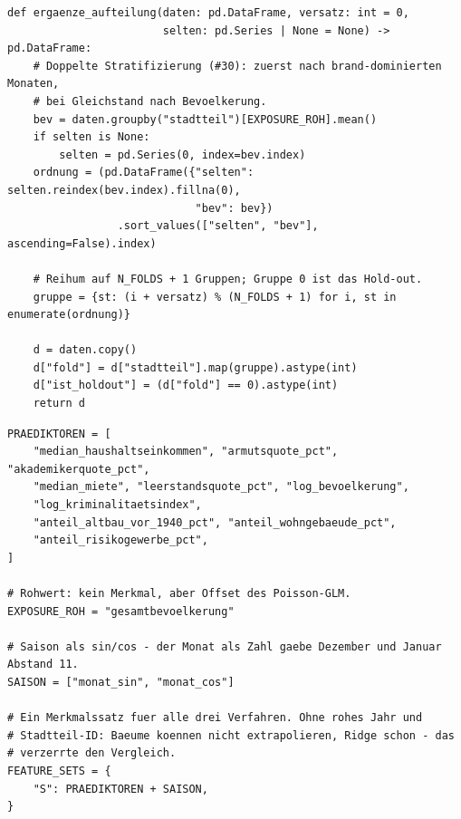 
\begin{lstlisting}[style=pythonstil,
  label={lst:folds},
  caption={Fold-Zuteilung mit doppelter Stratifizierung
           (\texttt{prep/s2\_datensaetze.py}, Z.~61--93, gekürzt)}]
def ergaenze_aufteilung(daten: pd.DataFrame, versatz: int = 0,
                        selten: pd.Series | None = None) -> pd.DataFrame:
    # Doppelte Stratifizierung (#30): zuerst nach brand-dominierten Monaten,
    # bei Gleichstand nach Bevoelkerung.
    bev = daten.groupby("stadtteil")[EXPOSURE_ROH].mean()
    if selten is None:
        selten = pd.Series(0, index=bev.index)
    ordnung = (pd.DataFrame({"selten": selten.reindex(bev.index).fillna(0),
                             "bev": bev})
                 .sort_values(["selten", "bev"], ascending=False).index)

    # Reihum auf N_FOLDS + 1 Gruppen; Gruppe 0 ist das Hold-out.
    gruppe = {st: (i + versatz) % (N_FOLDS + 1) for i, st in enumerate(ordnung)}

    d = daten.copy()
    d["fold"] = d["stadtteil"].map(gruppe).astype(int)
    d["ist_holdout"] = (d["fold"] == 0).astype(int)
    return d
\end{lstlisting}



\begin{lstlisting}[style=pythonstil,
  label={lst:merkmalsliste},
  caption={Merkmalssatz, einmalig hinterlegt
           (\texttt{prep/config.py}, Z.~106--131, gekürzt)}]
PRAEDIKTOREN = [
    "median_haushaltseinkommen", "armutsquote_pct", "akademikerquote_pct",
    "median_miete", "leerstandsquote_pct", "log_bevoelkerung",
    "log_kriminalitaetsindex",
    "anteil_altbau_vor_1940_pct", "anteil_wohngebaeude_pct",
    "anteil_risikogewerbe_pct",
]

# Rohwert: kein Merkmal, aber Offset des Poisson-GLM.
EXPOSURE_ROH = "gesamtbevoelkerung"

# Saison als sin/cos - der Monat als Zahl gaebe Dezember und Januar Abstand 11.
SAISON = ["monat_sin", "monat_cos"]

# Ein Merkmalssatz fuer alle drei Verfahren. Ohne rohes Jahr und
# Stadtteil-ID: Baeume koennen nicht extrapolieren, Ridge schon - das
# verzerrte den Vergleich.
FEATURE_SETS = {
    "S": PRAEDIKTOREN + SAISON,
}
\end{lstlisting}


